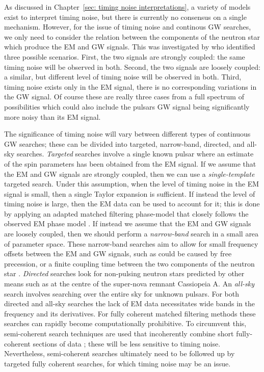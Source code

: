 \documentclass[../full_thesis/full_thesis.tex]{subfiles}
\begin{document}
As discussed in Chapter~\ref{sec: timing noise interpretations},
a variety of models exist to interpret timing noise, but there is
currently no consensus on a single mechanism. However, for the issue of timing
noise and continous GW searches, we only need to consider the relation between the
components of the neutron star which produce the EM and GW signals.  This was
investigated by \citet{Jones2004} who identified three possible scenarios.
First, the two signals are strongly coupled: the same timing noise will be
observed in both. Second, the two signals are loosely coupled: a similar, but
different level of timing noise will be observed in both. Third, timing noise
exists only in the EM signal, there is no corresponding variations in the GW
signal. Of course these are really three cases from a full spectrum of
possibilities which could also include the pulsars GW signal being
significantly more noisy than its EM signal.

The significance of timing noise will vary between different types of continuous GW
searches; these can be divided into targeted, narrow-band, directed, and
all-sky searches.  \emph{Targeted} searches involve a single known pulsar where
an estimate of the spin parameters has been obtained from the EM signal. If we
assume that the EM and GW signals are strongly coupled, then we can use a
\emph{single-template} targeted search. Under this assumption, when the level
of timing noise in the EM signal is small, then a single Taylor expansion is
sufficient.  If instead the level of timing noise is large, then the EM data
can be used to account for it; this is done by applying an adapted
matched filtering phase-model that closely follows the observed EM phase model
\citep{Pitkin2004}. If instead we assume that the EM and GW signals are
loosely coupled, then we should perform a \emph{narrow-band} search in a small
area of parameter space.  These narrow-band searches aim to allow for small
frequency offsets between the EM and GW signals, such as could be caused by
free precession, or a finite coupling time between the two components of the
neutron star \citep{ligo2008}. \emph{Directed} searches look for non-pulsing
neutron stars predicted by other means such as at the centre of the super-nova
remnant Cassiopeia A. An \emph{all-sky} search involves searching over the
entire sky for unknown pulsars. For both directed and all-sky searches the lack
of EM data necessitates wide bands in the frequency and its derivatives. For
fully coherent matched filtering methods these searches can rapidly become
computationally prohibitive. To circumvent this, semi-coherent search
techniques are used that incoherently combine short fully-coherent sections of
data \citep{ligo2012}; these will be less sensitive to timing noise.
Nevertheless, semi-coherent searches  ultimately need to be followed up by
targeted fully coherent searches, for which timing noise may be an issue.
\end{document}
